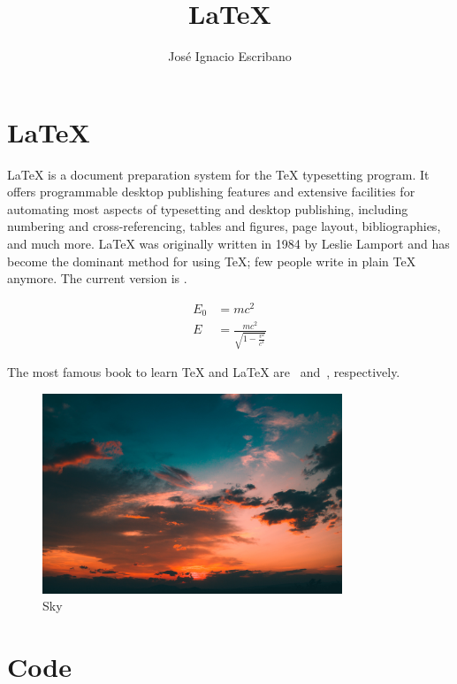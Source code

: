 \documentclass{article}
\title{\LaTeX}
\author{José Ignacio Escribano}
\begin{document}
  \maketitle

  \tableofcontents

  \newpage

  \section{\LaTeX}

  \LaTeX{} is a document preparation system for
  the \TeX{} typesetting program. It offers
  programmable desktop publishing features and
  extensive facilities for automating most
  aspects of typesetting and desktop publishing,
  including numbering and  cross-referencing,
  tables and figures, page layout,
  bibliographies, and much more. \LaTeX{} was
  originally written in 1984 by Leslie Lamport
  and has become the  dominant method for using
  \TeX; few people write in plain \TeX{} anymore.
  The current version is \LaTeXe.

  \begin{align}
    E_0 &= mc^2 \\
    E &= \frac{mc^2}{\sqrt{1-\frac{v^2}{c^2}}}
  \end{align}

  The most famous book to learn \TeX{} and \LaTeX{}
  are~\cite{texbook} and~\cite{latex}, respectively.

  \begin{figure}[htbp!]
    \centering
    \includegraphics[width=0.8\textwidth]{sky}
    \caption{Sky}
  \end{figure}

  \blindmathtrue
  \blinddocument
  \blindmathpaper

  \section{Code}
\end{document}
